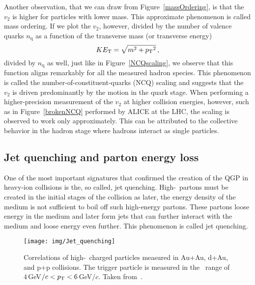 Another observation, that we can draw from Figure~\ref{massOrdering}, is that the $v_2$ is higher for particles with lower mass. This approximate phenomenon is called mass ordering. 
If we plot the $v_2$, however, divided by the number of valence quarks $n_\mathrm{q}$ as a function of the transverse mass (or transverse energy)
\begin{equation}
 K E_\mathrm{T}  = \sqrt{m^2 + {p_{\mathrm{T}}}^2}\,,
\end{equation}
divided by $n_\mathrm{q}$ as well, just like in Figure~\ref{NCQscaling}, we observe that this function aligns remarkably for all the measured hadron species. This phenomenon is called the number-of-constituent-quarks (NCQ) scaling and suggests that the $v_2$ is driven predominantly by the motion in the quark stage. When performing a higher-precision measurement of the $v_2$ at higher collision energies, however, such as in Figure~\ref{brokenNCQ} performed by ALICE at the LHC, the scaling is observed to work only approximately. This can be attributed to the collective behavior in the hadron stage where hadrons interact as single particles.



\subsection{Jet quenching and parton energy loss}

One of the most important signatures that confirmed the creation of the QGP in heavy-ion collisions is the, so called, jet quenching. High-\pt\ partons must be created in the initial stages of the collision as later, the energy density of the medium is not sufficient to boil off such high-energy partons. These partons loose energy in the medium and later form jets that can further interact with the medium and loose energy even further. This phenomenon is called jet quenching.

\begin{figure}[!htb]
\centering
\texttt{[image: img/Jet\_quenching]}
\caption[Correlations of high-\pt\ charged particles measured in Au+Au, d+Au, and p+p collisions.]{\label{jetQuenching}Correlations of high-\pt\ charged particles measured in Au+Au, d+Au, and p+p collisions. The trigger particle is measured in the \pt\ range of $4\,$GeV$/c < {p_{\mathrm{T}}} < 6\,$GeV$/c$\@. Taken from~\cite{jetQuenching }\@.}

\end{figure}


